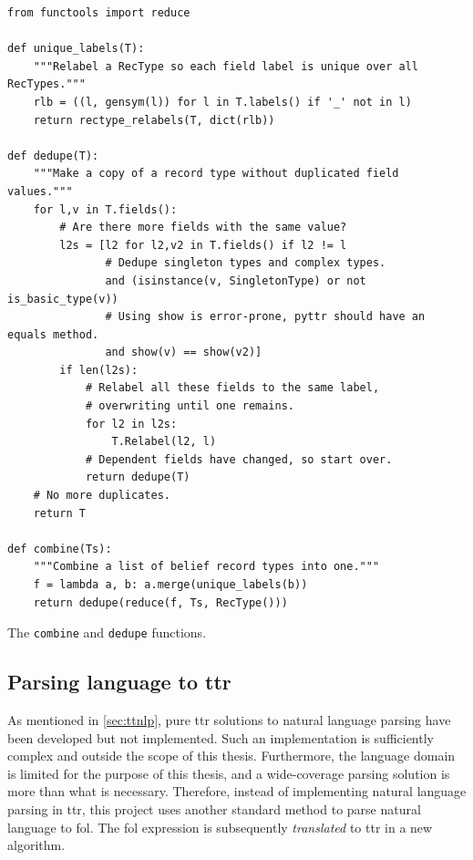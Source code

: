 \begin{listing}
\begin{lstlisting}
from functools import reduce

def unique_labels(T):
    """Relabel a RecType so each field label is unique over all RecTypes."""
    rlb = ((l, gensym(l)) for l in T.labels() if '_' not in l)
    return rectype_relabels(T, dict(rlb))

def dedupe(T):
    """Make a copy of a record type without duplicated field values."""
    for l,v in T.fields():
        # Are there more fields with the same value?
        l2s = [l2 for l2,v2 in T.fields() if l2 != l
               # Dedupe singleton types and complex types.
               and (isinstance(v, SingletonType) or not is_basic_type(v))
               # Using show is error-prone, pyttr should have an equals method.
               and show(v) == show(v2)]
        if len(l2s):
            # Relabel all these fields to the same label,
			# overwriting until one remains.
            for l2 in l2s:
                T.Relabel(l2, l)
            # Dependent fields have changed, so start over.
            return dedupe(T)
    # No more duplicates.
    return T

def combine(Ts):
    """Combine a list of belief record types into one."""
    f = lambda a, b: a.merge(unique_labels(b))
    return dedupe(reduce(f, Ts, RecType()))
\end{lstlisting}
\caption{The \texttt{combine} and \texttt{dedupe} functions.}
\label{lst:combine}
\end{listing}



\subsection{Parsing language to \gls{ttr}}
\label{sec:parsing}

As mentioned in \autoref{sec:ttnlp}, pure \gls{ttr} solutions to natural language parsing have been developed but not implemented.
Such an implementation is sufficiently complex and outside the scope of this thesis.
Furthermore, the language domain is limited for the purpose of this thesis, and a wide-coverage parsing solution is more than what is necessary.
Therefore, instead of implementing natural language parsing in \gls{ttr}, this project uses
another standard method to parse natural language to \gls{fol}.
The \gls{fol} expression is subsequently \textit{translated} to \gls{ttr} in a new algorithm.

